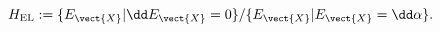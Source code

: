 \begin{equation}
  H_{\mathrm{EL}}:=\{E_{\vect{X}}|\dd E_{\vect{X}}=0\}/
  \{E_{\vect{X}}|E_{\vect{X}}=\dd \alpha\}.
\label{eq:HEL}
\end{equation}


